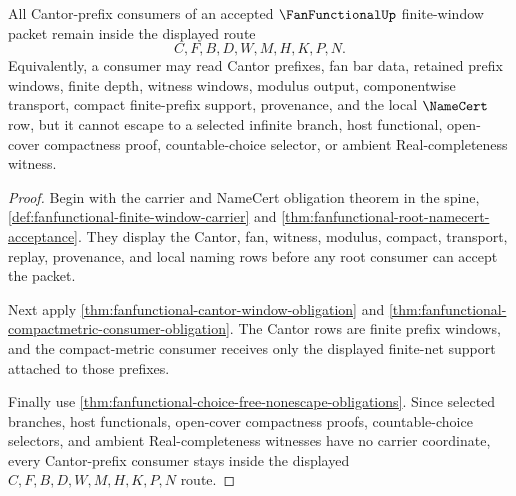 \begin{theorem}
\label{thm:fan-functional-cantor-prefix-nonescape}
All Cantor-prefix consumers of an accepted $\FanFunctionalUp$ finite-window packet remain inside the displayed route
$$
C,F,B,D,W,M,H,K,P,N .
$$
Equivalently, a consumer may read Cantor prefixes, fan bar data, retained prefix windows, finite depth, witness windows, modulus output, componentwise transport, compact finite-prefix support, provenance, and the local $\NameCert$ row, but it cannot escape to a selected infinite branch, host functional, open-cover compactness proof, countable-choice selector, or ambient Real-completeness witness.
\end{theorem}
\begin{proof}
Begin with the carrier and NameCert obligation theorem in the spine, \autoref{def:fanfunctional-finite-window-carrier} and \autoref{thm:fanfunctional-root-namecert-acceptance}. They display the Cantor, fan, witness, modulus, compact, transport, replay, provenance, and local naming rows before any root consumer can accept the packet.

Next apply \autoref{thm:fanfunctional-cantor-window-obligation} and \autoref{thm:fanfunctional-compactmetric-consumer-obligation}. The Cantor rows are finite prefix windows, and the compact-metric consumer receives only the displayed finite-net support attached to those prefixes.

Finally use \autoref{thm:fanfunctional-choice-free-nonescape-obligations}. Since selected branches, host functionals, open-cover compactness proofs, countable-choice selectors, and ambient Real-completeness witnesses have no carrier coordinate, every Cantor-prefix consumer stays inside the displayed $C,F,B,D,W,M,H,K,P,N$ route.
\end{proof}
